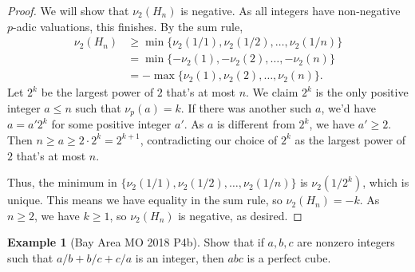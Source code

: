 \documentclass[11pt]{article}
\theoremstyle{definition}
\newtheorem{example}{Example}
\begin{document}
\begin{proof}
We will show that $\nu_2(H_n)$ is negative. As all integers have non-negative $p$-adic valuations, this finishes. By the sum rule,
\begin{align*}
  \nu_2(H_n)
  &\ge \min\{\nu_2(1/1), \nu_2(1/2), \ldots, \nu_2(1/n)\} \\
  &= \min\{-\nu_2(1), -\nu_2(2), \ldots, -\nu_2(n)\} \\
  &= -\max\{\nu_2(1), \nu_2(2), \ldots, \nu_2(n)\}.
\end{align*}
Let $2^k$ be the largest power of $2$ that's at most $n$. We claim $2^k$ is the only positive integer $a \le n$ such that $\nu_p(a) = k$. If there was another such $a$, we'd have $a = a'2^k$ for some positive integer $a'$. As $a$ is different from $2^k$, we have $a' \ge 2$. Then $n \ge a \ge 2 \cdot 2^k = 2^{k+1}$, contradicting our choice of $2^k$ as the largest power of $2$ that's at most $n$.

Thus, the minimum in $\{\nu_2(1/1), \nu_2(1/2), \ldots, \nu_2(1/n)\}$ is $\nu_2(1/2^k)$, which is unique. This means we have equality in the sum rule, so $\nu_2(H_n) = -k$. As $n \ge 2$, we have $k \ge 1$, so $\nu_2(H_n)$ is negative, as desired.
\end{proof}

\begin{example}[Bay Area MO 2018 P4b]
Show that if $a, b, c$ are nonzero integers such that $a/b + b/c + c/a$ is an integer, then $abc$ is a perfect cube.
\end{example}
\end{document}
